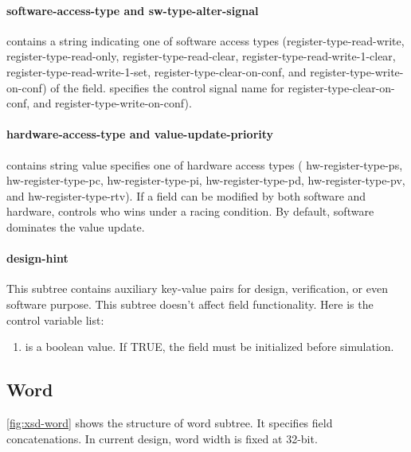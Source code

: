 \documentclass[10pt,oneside]{book}
\begin{document}
\paragraph{software-access-type and sw-type-alter-signal}
 contains a string indicating 
one of software access types (\gls{register-type-read-write}, 
\gls{register-type-read-only}, 
\gls{register-type-read-clear}, 
\gls{register-type-read-write-1-clear}, 
\gls{register-type-read-write-1-set}, 
\gls{register-type-clear-on-conf}, and 
\gls{register-type-write-on-conf}) of the field. 
 specifies the control signal 
name for \gls{register-type-clear-on-conf}, and \gls{register-type-write-on-conf}). 





\paragraph{hardware-access-type and value-update-priority}
 contains string value
specifies one of hardware access types (
\gls{hw-register-type-ps}, \gls{hw-register-type-pc}, 
\gls{hw-register-type-pi}, \gls{hw-register-type-pd}, 
\gls{hw-register-type-pv}, and \gls{hw-register-type-rtv}). 
If a \gls{field} can be modified by both software and hardware, 
 controls who wins 
under a racing condition. By default, software dominates the value update. 


\paragraph{design-hint}
This subtree contains auxiliary key-value pairs for design, verification, 
or even software purpose. This subtree doesn't affect \gls{field} functionality. 
Here is the control variable list:
\begin{enumerate}
\item {} is a boolean value. If TRUE, 
  the field must be initialized before simulation. 
\end{enumerate}

\subsection{Word}
\autoref{fig:xsd-word} shows the structure of word subtree. 
It specifies field concatenations. In current design, word width 
is fixed at 32-bit. 
\end{document}

